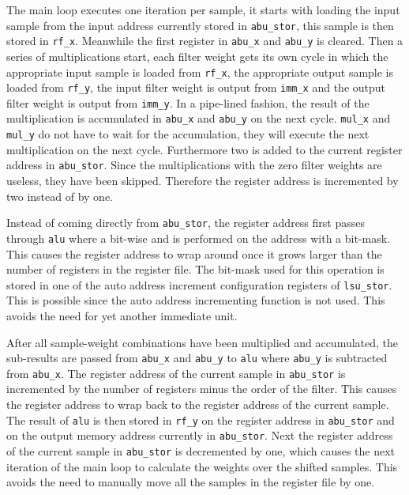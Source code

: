 \documentclass[10pt,twocolumn]{article}
\begin{document}
The main loop executes one iteration per sample, it starts with
loading the input sample from the input address currently stored in
\texttt{abu\_stor}, this sample is then stored in \texttt{rf\_x}.
Meanwhile the first register in \texttt{abu\_x} and \texttt{abu\_y} is
cleared. Then a series of multiplications start, each filter weight
gets its own cycle in which the appropriate input sample is loaded
from \texttt{rf\_x}, the appropriate output sample is loaded from
\texttt{rf\_y}, the input filter weight is output from \texttt{imm\_x}
and the output filter weight is output from \texttt{imm\_y}. In a
pipe-lined fashion, the result of the multiplication is accumulated in
\texttt{abu\_x} and \texttt{abu\_y} on the next cycle. \texttt{mul\_x}
and \texttt{mul\_y} do not have to wait for the accumulation, they
will execute the next multiplication on the next cycle. Furthermore
two is added to the current register address in \texttt{abu\_stor}.
Since the multiplications with the zero filter weights are useless,
they have been skipped. Therefore the register address is incremented
by two instead of by one.

Instead of coming directly from \texttt{abu\_stor}, the register
address first passes through \texttt{alu} where a bit-wise and is
performed on the address with a bit-mask. This causes the register
address to wrap around once it grows larger than the number of
registers in the register file. The bit-mask used for this operation
is stored in one of the auto address increment configuration registers
of \texttt{lsu\_stor}. This is possible since the auto address
incrementing function is not used. This avoids the need for yet
another immediate unit.

After all sample-weight combinations have been multiplied and
accumulated, the sub-results are passed from \texttt{abu\_x} and
\texttt{abu\_y} to \texttt{alu} where \texttt{abu\_y} is subtracted
from \texttt{abu\_x}. The register address of the current sample in
\texttt{abu\_stor} is incremented by the number of registers minus the
order of the filter. This causes the register address to wrap back to
the register address of the current sample. The result of \texttt{alu}
is then stored in \texttt{rf\_y} on the register address in
\texttt{abu\_stor} and on the output memory address currently in
\texttt{abu\_stor}. Next the register address of the current sample in
\texttt{abu\_stor} is decremented by one, which causes the next
iteration of the main loop to calculate the weights over the shifted
samples. This avoids the need to manually move all the samples in the
register file by one.
\end{document}
